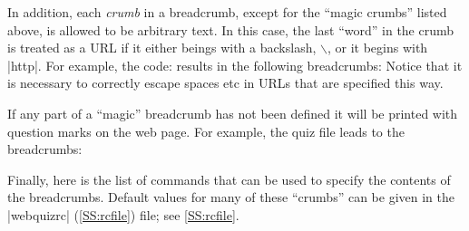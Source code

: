 \documentclass[svgnames]{article}
\newcommand\webquizrc{\index{webquizrc}%
  \BashCode|webquizrc| (\autoref{SS:rcfile})\xspace%
}
\begin{document}
  \noindent
  In addition, each \textit{crumb} in a breadcrumb, except for the
  ``magic crumbs'' listed above, is allowed to be arbitrary text. In
  this case, the last ``word'' in the crumb is treated as a URL if it
  either beings with a backslash, $\backslash$, or it begins with
  \BashCode|http|.  For example, the code:
  \noindent
  results in the following breadcrumbs:
  Notice that it is necessary to correctly escape spaces etc in
  URLs that are specified this way.

  If any part of a ``magic'' breadcrumb has not been defined it will be
  printed with question marks on the web page. For example, the quiz
  file
  leads to the breadcrumbs:

  Finally, here is the list of \WebQuiz commands that can be used to
  specify the contents of the breadcrumbs. Default values for many of these
  ``crumbs'' can be given in the \webquizrc file; see \autoref{SS:rcfile}.
\end{document}
